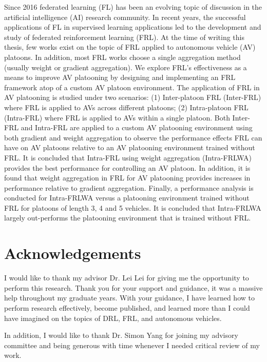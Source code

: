 \documentclass[oneside, 12pt]{book}
\begin{document}
Since 2016 federated learning (FL) has been an evolving topic of discussion in the artificial
intelligence (AI) research community.  In recent years, the successful applications of FL
in supervised learning applications led to the development and study of
federated reinforcement learning (FRL).  At the time of writing this thesis,
few works exist on the topic of FRL applied to
autonomous vehicle (AV) platoons. In addition, most FRL works choose a single aggregation
method (usually weight or gradient aggregation). We explore FRL's effectiveness as a means
to improve AV platooning by designing and implementing an FRL framework atop of a custom
AV platoon environment.  The application of FRL in AV platooning is studied under two
scenarios: (1)  Inter-platoon FRL (Inter-FRL) where FRL is applied to AVs across different
platoons; (2) Intra-platoon FRL (Intra-FRL) where FRL is applied to AVs within a single
platoon. Both Inter-FRL and Intra-FRL are applied to a custom AV platooning environment using
both gradient and weight aggregation to observe the performance effects FRL can have on AV
platoons relative to an AV platooning environment trained without FRL.  It is concluded that
Intra-FRL using weight aggregation (Intra-FRLWA) provides the best performance for
controlling an AV platoon. In addition, it is found that weight aggregation in FRL for
AV platooning provides increases in performance relative to gradient aggregation.
Finally, a performance analysis is conducted for Intra-FRLWA versus a platooning
environment trained without FRL for platoons of length 3, 4 and 5 vehicles. It is concluded
that Intra-FRLWA largely out-performs the platooning environment that is trained without FRL.

\chapter*{Acknowledgements}
\pagestyle{plain} %
I would like to thank my advisor Dr. Lei Lei for giving me the opportunity to perform this research.
Thank you for your support and guidance, it was a massive help throughout my graduate years.  With your guidance,
I have learned how to perform research effectively, become published, and learned more than I could have imagined on
the topics of DRL, FRL, and autonomous vehicles.

In addition, I would like to thank Dr. Simon Yang for joining my advisory committee and being
generous with time whenever I needed critical review of my work.
\tableofcontents
{}
\listoftables
{}
\listoffigures
{}
\newpage
\end{document}
